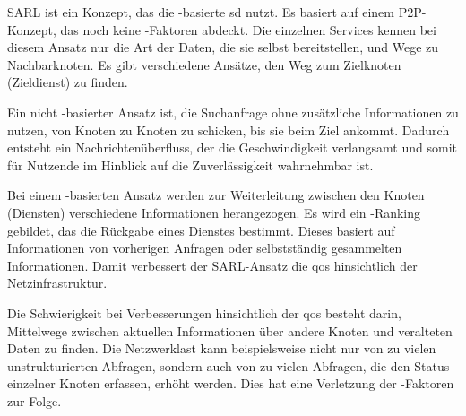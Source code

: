 SARL \autocite{Kosunalp.2020.SArlbQaIsdm} ist ein Konzept, das die -basierte \gls{sd} nutzt. Es basiert auf einem P2P-Konzept, das noch keine -Faktoren abdeckt. Die einzelnen Services kennen bei diesem Ansatz nur die Art der Daten, die sie selbst bereitstellen, und Wege zu Nachbarknoten.
Es gibt verschiedene Ansätze, den Weg zum Zielknoten (Zieldienst) zu finden.

Ein nicht -basierter Ansatz ist, die Suchanfrage ohne zusätzliche Informationen zu nutzen, von Knoten zu Knoten zu schicken, bis sie beim Ziel ankommt. Dadurch entsteht ein Nachrichtenüberfluss, der die Geschwindigkeit verlangsamt und somit für Nutzende im Hinblick auf die Zuverlässigkeit wahrnehmbar ist.

Bei einem -basierten Ansatz werden zur Weiterleitung zwischen den Knoten (Diensten) verschiedene Informationen herangezogen. Es wird ein -Ranking gebildet, das die Rückgabe eines Dienstes bestimmt. Dieses basiert auf Informationen von vorherigen Anfragen oder selbstständig gesammelten Informationen. Damit verbessert der SARL-Ansatz die \gls{qos} hinsichtlich der Netzinfrastruktur.

Die Schwierigkeit bei Verbesserungen hinsichtlich der \gls{qos} besteht darin, Mittelwege zwischen aktuellen Informationen über andere Knoten und veralteten Daten zu finden. Die Netzwerklast kann beispielsweise nicht nur von zu vielen unstrukturierten Abfragen, sondern auch von zu vielen Abfragen, die den Status einzelner Knoten erfassen, erhöht werden. Dies hat eine Verletzung der -Faktoren zur Folge.
